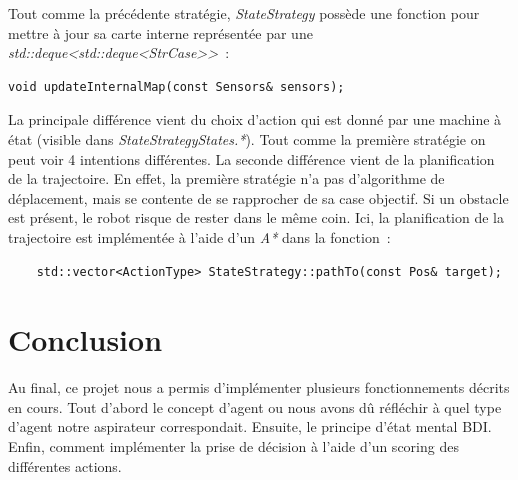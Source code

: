 \documentclass{article}
\begin{document}
Tout comme la précédente stratégie, \emph{StateStrategy} possède une fonction pour mettre à jour sa carte interne représentée par une \emph{std::deque<std::deque<StrCase>>}~:
\begin{verbatim}
void updateInternalMap(const Sensors& sensors);
\end{verbatim}
La principale différence vient du choix d'action qui est donné par une machine à état (visible dans \emph{StateStrategyStates.*}). Tout comme la première stratégie on peut voir 4 intentions différentes. La seconde différence vient de la planification de la trajectoire. En effet, la première stratégie n'a pas d'algorithme de déplacement, mais se contente de se rapprocher de sa case objectif. Si un obstacle est présent, le robot risque de rester dans le même coin. Ici, la planification de la trajectoire est implémentée à l'aide d'un \emph{A*} dans la fonction~:
\begin{verbatim}
	std::vector<ActionType> StateStrategy::pathTo(const Pos& target);
\end{verbatim}


\section{Conclusion}
Au final, ce projet nous a permis d'implémenter plusieurs fonctionnements décrits en cours. Tout d'abord le concept d'agent ou nous avons dû réfléchir à quel type d'agent notre aspirateur correspondait. Ensuite, le principe d'état mental BDI. Enfin, comment implémenter la prise de décision à l'aide d'un scoring des différentes actions.
\end{document}
